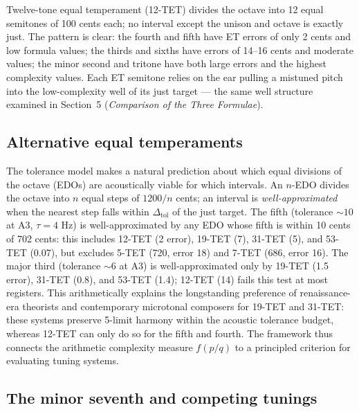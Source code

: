 \documentclass[11pt,a4paper]{article}
\newcommand{\ct}{\textcent}  %
\begin{document}
Twelve-tone equal temperament (12-TET) divides the octave into 12 equal
semitones of 100 cents each; no interval except the unison and octave is
exactly just. The pattern is clear: the fourth and fifth have ET errors of
only 2 cents and low formula values; the thirds and sixths have errors of
14--16 cents and moderate values; the minor second and tritone have both
large errors and the highest complexity values. Each ET semitone relies on
the ear pulling a
mistuned pitch into the low-complexity well of its just target --- the same
well structure examined in Section~5 (\emph{Comparison of the Three Formulae}).

\subsection*{Alternative equal temperaments}

The tolerance model makes a natural prediction about which equal divisions of
the octave (EDOs) are acoustically viable for which intervals. An $n$-EDO
divides the octave into $n$ equal steps of $1200/n$ cents; an interval is
\emph{well-approximated} when the nearest step falls within
$\Delta_{\mathrm{tol}}$ of the just target. The fifth (tolerance $\sim 10$\ct{}
at A3, $\tau = 4$ Hz) is well-approximated by any EDO whose fifth is within
10 cents of 702 cents: this includes 12-TET (2\ct{} error), 19-TET (7\ct{}), 31-TET
(5\ct{}), and 53-TET (0.07\ct{}), but excludes 5-TET (720\ct{}, error 18\ct{}) and
7-TET (686\ct{}, error 16\ct{}). The major third (tolerance $\sim 6$\ct{} at A3) is
well-approximated only by 19-TET (1.5\ct{} error), 31-TET (0.8\ct{}), and 53-TET
(1.4\ct{}); 12-TET (14\ct{}) fails this test at most registers. This arithmetically
explains the longstanding preference of renaissance-era theorists and
contemporary microtonal composers for 19-TET and 31-TET: these systems
preserve 5-limit harmony within the acoustic tolerance budget, whereas 12-TET
can only do so for the fifth and fourth. The framework thus connects the
arithmetic complexity measure $f(p/q)$ to a principled criterion for
evaluating tuning systems.

\subsection*{The minor seventh and competing tunings}
\end{document}
